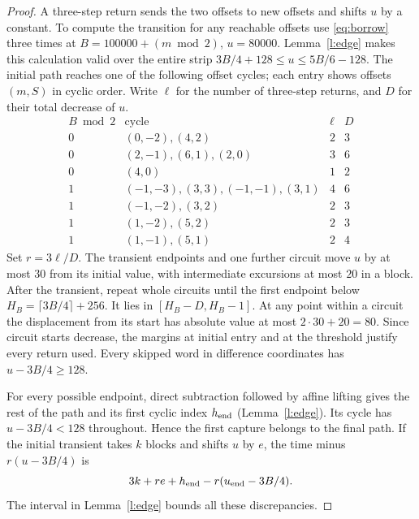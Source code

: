 \documentclass[11pt,reqno]{amsart}
\begin{document}
\begin{proof}
A three-step return sends the two offsets to new offsets and shifts $u$
by a constant. To compute the transition for any reachable offsets use
\eqref{eq:borrow} three times at $B=100000+(m\bmod2)$, $u=80000$.
Lemma~\ref{l:edge} makes this calculation valid over the entire strip
$3B/4+128\le u\le5B/6-128$. The initial path reaches one of the following
offset cycles; each entry shows offsets $(m,S)$ in cyclic order. Write
$\ell$ for the number of three-step returns, and $D$ for their total
decrease of $u$.
\[
\begin{array}{c|l|rr}
 B\bmod2&\text{cycle}&\ell&D\\\hline
0&(0,-2),(4,2)&2&3\\
0&(2,-1),(6,1),(2,0)&3&6\\
0&(4,0)&1&2\\
1&(-1,-3),(3,3),(-1,-1),(3,1)&4&6\\
1&(-1,-2),(3,2)&2&3\\
1&(1,-2),(5,2)&2&3\\
1&(1,-1),(5,1)&2&4
\end{array}
\]
Set $r=3\ell/D$. The transient endpoints and one further circuit move
$u$ by at most $30$ from its initial value, with intermediate excursions
at most $20$ in a block. After the transient, repeat whole circuits until
the first endpoint below $H_B=\lceil3B/4\rceil+256$. It lies in
$[H_B-D,H_B-1]$. At any point within a circuit the displacement from its
start has absolute value at most $2\cdot30+20=80$. Since circuit starts
decrease, the margins at initial entry and at the threshold justify every
return used. Every skipped word in difference coordinates has $u-3B/4\ge128$.

For every possible endpoint, direct subtraction followed by affine lifting
gives the rest of the path and its first cyclic index $h_{\rm end}$
(Lemma~\ref{l:edge}). Its cycle has $u-3B/4<128$ throughout. Hence the
first capture belongs to the final path. If the initial transient takes
$k$ blocks and shifts $u$ by $e$, the time minus $r(u-3B/4)$ is
\[
 3k+re+h_{\rm end}-r(u_{\rm end}-3B/4).
\]
The interval in Lemma~\ref{l:edge} bounds all these discrepancies.
\end{proof}
\end{document}
